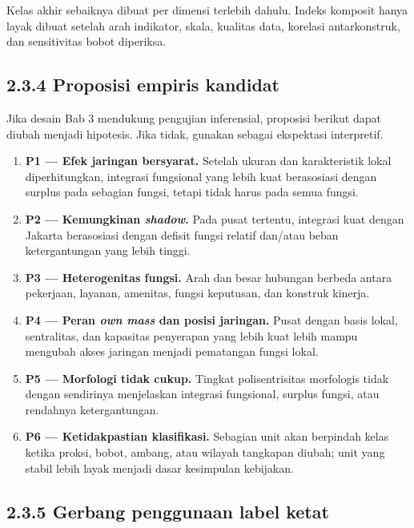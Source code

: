 \documentclass[
  indonesian,
  11pt,
  a4paper,
  oneside,
  openany]{report}
\providecommand{\tightlist}{%
  \setlength{\itemsep}{0pt}\setlength{\parskip}{0pt}}
\begin{document}
Kelas akhir sebaiknya dibuat per dimensi terlebih dahulu. Indeks
komposit hanya layak dibuat setelah arah indikator, skala, kualitas
data, korelasi antarkonstruk, dan sensitivitas bobot diperiksa.

\subsection{2.3.4 Proposisi empiris
kandidat}\label{proposisi-empiris-kandidat}

Jika desain Bab 3 mendukung pengujian inferensial, proposisi berikut
dapat diubah menjadi hipotesis. Jika tidak, gunakan sebagai ekspektasi
interpretif.

\begin{enumerate}
\def\labelenumi{\arabic{enumi}.}
\tightlist
\item
  \textbf{P1 --- Efek jaringan bersyarat.} Setelah ukuran dan
  karakteristik lokal diperhitungkan, integrasi fungsional yang lebih
  kuat berasosiasi dengan surplus pada sebagian fungsi, tetapi tidak
  harus pada semua fungsi.
\item
  \textbf{P2 --- Kemungkinan \emph{shadow}.} Pada pusat tertentu,
  integrasi kuat dengan Jakarta berasosiasi dengan defisit fungsi
  relatif dan/atau beban ketergantungan yang lebih tinggi.
\item
  \textbf{P3 --- Heterogenitas fungsi.} Arah dan besar hubungan berbeda
  antara pekerjaan, layanan, amenitas, fungsi keputusan, dan konstruk
  kinerja.
\item
  \textbf{P4 --- Peran \emph{own mass} dan posisi jaringan.} Pusat
  dengan basis lokal, sentralitas, dan kapasitas penyerapan yang lebih
  kuat lebih mampu mengubah akses jaringan menjadi pematangan fungsi
  lokal.
\item
  \textbf{P5 --- Morfologi tidak cukup.} Tingkat polisentrisitas
  morfologis tidak dengan sendirinya menjelaskan integrasi fungsional,
  surplus fungsi, atau rendahnya ketergantungan.
\item
  \textbf{P6 --- Ketidakpastian klasifikasi.} Sebagian unit akan
  berpindah kelas ketika proksi, bobot, ambang, atau wilayah tangkapan
  diubah; unit yang stabil lebih layak menjadi dasar kesimpulan
  kebijakan.
\end{enumerate}

\subsection{2.3.5 Gerbang penggunaan label
ketat}\label{gerbang-penggunaan-label-ketat}
\end{document}
